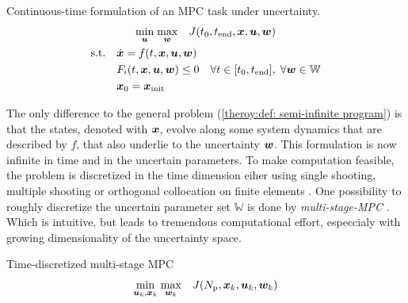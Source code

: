 \begin{definition} Continuous-time formulation of an MPC task under uncertainty.
    \label{theory:def: continuous mpc}
    \[
        \begin{gathered}
            \underset{{\bm{u}}}{\min} \; \underset{{\bm{w}}}{\max} \quad  J(t_0, t_\text{end}, {\bm{x}}, {\bm{u}}, {\bm{w}}) \\
            \begin{aligned}
                \text{s.t.} \quad &\dot{{\bm{x}}} = f(t, {\bm{x}}, {\bm{u}}, {\bm{w}}) \\
                & F_i(t, {\bm{x}}, {\bm{u}}, {\bm{w}}) \leq 0 \quad \forall t \in [t_0, t_\text{end}], \; \forall {\bm{w}} \in \mathbb{W} \\
                & {\bm{x}}_0 = {\bm{x}}_\text{init}
            \end{aligned}
        \end{gathered}
    \]
\end{definition}

The only difference to the general problem (\ref{theroy:def: semi-infinite program}) is that the states, denoted with ${\bm{x}}$,
evolve along some system dynamics that are described by $f$, that also underlie to the uncertainty ${\bm{w}}$.
This formulation is now infinite in time and in the uncertain parameters. To make computation feasible,
the problem is discretized in the time dimension eiher using single shooting, multiple shooting or orthogonal collocation
on finite elements \cite{}. One possibility to roughly discretize the uncertain parameter set $\mathbb{W}$ is
done by \emph{multi-stage-MPC} \cite{}. Which is intuitive, but leads to tremendous computational effort, especcialy 
with growing dimensionality of the uncertainty space.

\begin{definition} Time-discretized multi-stage MPC
    \label{theory:def: multi-stage-mpc}
    \[
        \begin{gathered}
            \underset{{\bm{u}}_k, {\bm{x}}_k}{\min} \; \underset{{\bm{w}}_k}{\max}  \quad  J(N_\text{p}, {\bm{x}}_k, {\bm{u}}_k, {\bm{w}}_k)
        \end{gathered}
    \]
\end{definition}



